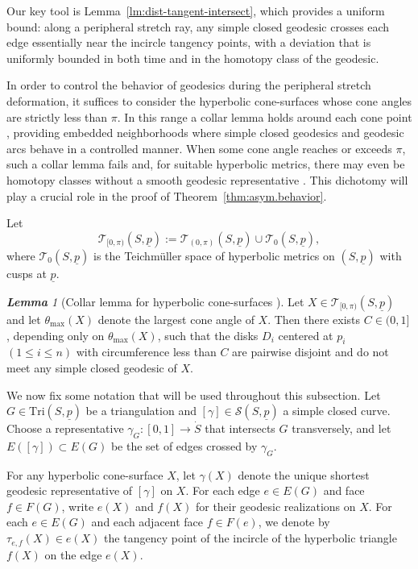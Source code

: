 \documentclass[11pt, letterpaper]{amsart}
\theoremstyle{definition}
\theoremstyle{remark}
\newtheorem{lemma}[theorem]{\rm\bf Lemma}
\newcommand{\up}{\underline{p}}
\newcommand{\Sp}{(S,\up)}
\newcommand{\TSp}{\text{Tri}\Sp}
\newcommand{\cT}{\mathcal{T}}
\newcommand{\cS}{\mathcal{S}}
\numberwithin{equation}{section}
\begin{document}
Our key tool is Lemma~\ref{lm:dist-tangent-intersect}, which provides a uniform bound: along a peripheral stretch ray, any simple closed geodesic crosses each edge essentially near the incircle tangency points, with a deviation that is uniformly bounded in both time and in the homotopy class of the geodesic.

In order to control the behavior of geodesics during the peripheral stretch deformation, it suffices to consider the hyperbolic cone-surfaces whose cone angles are strictly less than \(\pi\).
In this range a collar lemma holds around each cone point \cite[Thm.~3]{DP07}, providing embedded neighborhoods where simple closed geodesics and geodesic arcs behave in a controlled manner.
When some cone angle reaches or exceeds \(\pi\), such a collar lemma fails and, for suitable hyperbolic metrics, there may even be homotopy classes without a smooth geodesic representative \cite[Lem.~7.3]{Mon10}.
This dichotomy will play a crucial role in the proof of Theorem~\ref{thm:asym.behavior}.

Let
\[
  \cT_{[0,\pi)}(S,\up)
  := \cT_{(0,\pi)}(S,\up) \cup \cT_{0}(S,\up),
\]
where \(\cT_0(S,\up)\) is the Teichm\"uller space of hyperbolic metrics on \((S,\up)\) with cusps at \(\up\).

\begin{lemma}[Collar lemma for hyperbolic cone-surfaces {\cite[Thm.~3]{DP07}}]
\label{lm:Collar-lemma-for-hyperbolic-cone-surfaces}
Let \(X \in \cT_{[0,\pi)}(S,\up)\) and let \(\theta_{\max}(X)\) denote the largest cone angle of \(X\).
Then there exists \(C \in (0,1]\), depending only on \(\theta_{\max}(X)\), such that the disks \(D_i\) centered at \(p_i\) \((1\le i\le n)\) with circumference less than \(C\) are pairwise disjoint and do not meet any simple closed geodesic of \(X\).
\end{lemma}



We now fix some notation that will be used throughout this subsection.
Let \(G \in \TSp\) be a triangulation and \([\gamma] \in \cS(S,\up)\) a simple closed curve.
Choose a representative \(\gamma_G : [0,1] \to \dot{S}\) that intersects \(G\) transversely, and let
\(E([\gamma]) \subset E(G)\) be the set of edges crossed by \(\gamma_G\).

For any hyperbolic cone-surface \(X\), let \(\gamma(X)\) denote the unique shortest geodesic representative of \([\gamma]\) on \(X\).
For each edge \(e \in E(G)\) and face \(f \in F(G)\), write \(e(X)\) and \(f(X)\) for their geodesic realizations on \(X\).
For each \(e \in E(G)\) and each adjacent face \(f \in F(e)\), we denote by
\(\tau_{e,f}(X) \in e(X)\) the tangency point of the incircle of the hyperbolic triangle
\(f(X)\) on the edge \(e(X)\).
\end{document}

